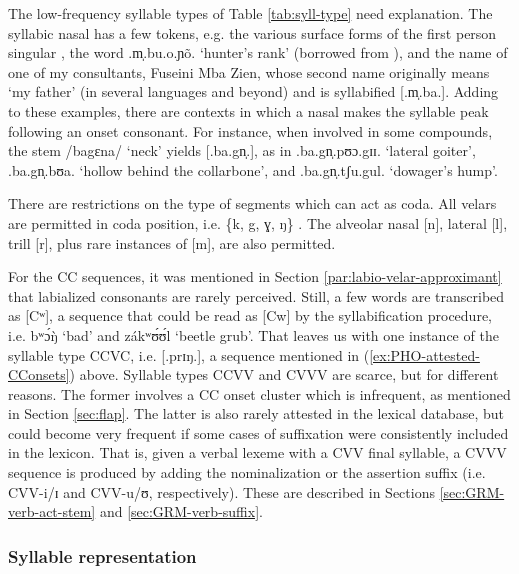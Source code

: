 The low-frequency  syllable types  of Table \ref{tab:syll-type} need explanation. The syllabic nasal has a few tokens, e.g.  the various surface forms of the first person singular ,  the word {\sls .m̩.bu.o.ɲõ.} `hunter's rank' (borrowed from ), and  the name of one of my consultants, Fuseini Mba Zien, whose second name  originally means  `my father' (in several  languages and beyond) and is syllabified [{\sls .m̩.ba.}].  Adding to these examples,  there are contexts in which  a nasal makes the syllable peak following an  onset consonant. For instance, when involved in some compounds, the stem  /{\sls bagɛna}/  `neck'  yields  [{\sls .ba.gn̩.}], as in {\sls .ba.gn̩.pʊɔ.gɪɪ.} `lateral goiter',  {\sls .ba.gn̩.bʊa.} `hollow behind the collarbone',   and {\sls .ba.gn̩.tʃu.gul.}  `dowager's hump'. 

There are restrictions on the type of segments which can act as coda. All velars are permitted in coda position, i.e. \{{k, g, ɣ, ŋ}\} . The alveolar nasal [{n}],   lateral [{l}],  trill [{r}], plus rare instances of [{m}],  are also permitted. 

For the CC sequences, it was mentioned in Section \ref{par:labio-velar-approximant} that labialized consonants are rarely perceived. Still, a few words are transcribed as   [{Cʷ}], a sequence that could be read as  [{Cw}] by the syllabification procedure, i.e.  {\sls bʷɔ́ŋ̀} `bad' and {\sls zákʷʊ́ʊ́l} `beetle grub'.  That leaves us with one  instance of the syllable type CCVC, i.e. [{\sls .prɪŋ.}],  a sequence mentioned in (\ref{ex:PHO-attested-CConsets}) above. Syllable types CCVV and CVVV are scarce, but for different reasons. The former involves a CC onset cluster which  is infrequent, as mentioned in Section \ref{sec:flap}.  The latter is also rarely attested in the lexical database,  but could become very frequent if some cases of suffixation  were consistently included in the lexicon. That is, given a verbal lexeme with a CVV final syllable,  a CVVV sequence is produced by adding the nominalization or the assertion suffix  (i.e. CVV-{i/ɪ}   and   CVV-{u/ʊ},  respectively).  These are described in Sections \ref{sec:GRM-verb-act-stem} and \ref{sec:GRM-verb-suffix}.  

\subsubsection{Syllable representation}
\label{sec:syllable-rep}

